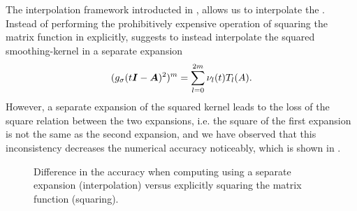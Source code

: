 The interpolation framework introducted in ,
allows us to interpolate the . Instead of performing the prohibitively
expensive operation of squaring the matrix function in 
explicitly, \cite{lin2017randomized} suggests to instead interpolate the
squared \gls{smoothing-kernel} in a separate expansion
\begin{equation}
    (g_{\sigma}(t\boldsymbol{I} - \boldsymbol{A})^2)^m = \sum_{l=0}^{2m} \nu_l(t) T_l(A).
    \label{equ:3-nystrom-ESS-chebyshev-expansion}
\end{equation}
However, a separate expansion of the squared kernel leads to the loss of the
square relation between the two expansions, i.e. the square of the
first expansion is not the same as the second expansion, and we have observed that
this inconsistency decreases the numerical accuracy noticeably, which is
shown in .\\
\begin{figure}[ht]
    \centering
    
    \caption{Difference in the accuracy when computing 
        using a separate expansion (interpolation) versus explicitly squaring
        the matrix function (squaring).}
    \label{fig:3-nystrom-interpolation-issue}
\end{figure}

